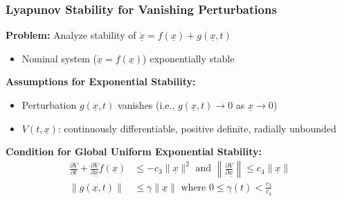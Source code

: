 \documentclass[student, noshadow, lsr, english, aspectratio=169, t]{ITR_LSR_slides}
\begin{document}
\begin{frame}
    \frametitle{Lyapunov Stability for Vanishing Perturbations}

    \textbf{Problem:} Analyze stability of $\dot{\underline{x}} = f(\underline{x}) + g(\underline{x}, t)$
    \begin{itemize}
        \item Nominal system ($\dot{\underline{x}} = f(\underline{x})$) exponentially stable
    \end{itemize}
	\vspace{0.3cm}
    \textbf{Assumptions for Exponential Stability:}
    \begin{itemize}
        \item Perturbation $g(\underline{x}, t)$ vanishes (i.e., $g(\underline{x}, t) \to 0$ as $\underline{x} \to 0$)
        \item $V(t,\underline{x})$: continuously differentiable, positive definite, radially unbounded
    \end{itemize}
    \vspace{0.3cm} %
    \textbf{Condition for Global Uniform Exponential Stability:}
    \begin{align*}
        \frac{\partial V}{\partial t}+\frac{\partial V}{\partial \underline{x}}f(\underline{x}) &\leq -c_3\|\underline{x}\|^2 \text{ and } \left\|\frac{\partial V}{\partial \underline{x}}\right\| \leq c_4\|\underline{x}\| \\[0.5em]
        \|g(\underline{x},t)\| &\leq \gamma\|\underline{x}\| \text{ where } 0 \leq \gamma(t) < \frac{c_3}{c_4}
    \end{align*}

\end{frame}


\end{document}
